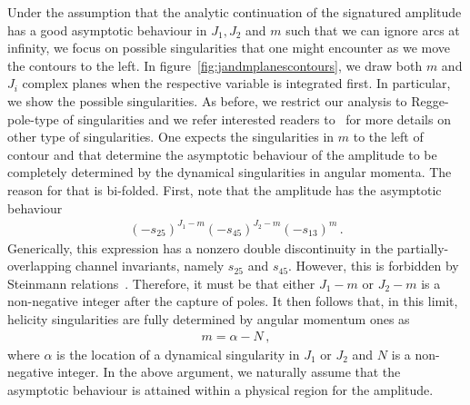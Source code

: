 Under the assumption that the analytic continuation of the signatured amplitude has a good asymptotic behaviour in $J_1, J_2$ and $m$ such that we can ignore arcs at infinity, we focus on possible singularities that one might encounter as we move the contours to the left.
In figure~\ref{fig:jandmplanescontours}, we draw both $m$ and $J_i$ complex planes when the respective variable is integrated first.
In particular, we show the possible singularities.
As before, we restrict our analysis to Regge-pole-type of singularities and we refer interested readers to~\cite{Weis:1972tbu,Brower:1974yv} for more details on other type of singularities. 
One expects the singularities in $m$ to the left of contour and that determine the asymptotic behaviour of the amplitude to be completely determined by the dynamical singularities in angular momenta. The reason for that is bi-folded. First, note that the
amplitude has the asymptotic behaviour
\begin{align}
  (-s_{25})^{J_1-m}(-s_{45})^{J_2-m}(-s_{13})^{m}\,.
\end{align}
Generically, this expression has a nonzero double discontinuity in the partially-overlapping channel invariants, namely $s_{25}$ and $s_{45}$.
However, this is forbidden by Steinmann relations~\cite{SteinmannThesis}.
Therefore, it must be that either $J_1-m$ or $J_2-m$ is a non-negative integer after the capture of poles.
It then follows that, in this limit, helicity singularities are fully determined by angular momentum ones as
\begin{align}
  m=\alpha-N\,,
\end{align}
where $\alpha$ is the location of a dynamical singularity in $J_1$ or $J_2$ and $N$ is a non-negative integer.
In the above argument, we naturally assume that the asymptotic behaviour is attained within a physical region for the amplitude.
